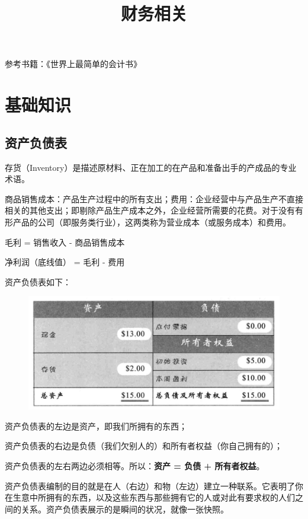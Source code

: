 \documentclass[12pt]{article}
\title{财务相关}
\begin{document}
\maketitle
\tableofcontents

参考书籍：《世界上最简单的会计书》

\section{基础知识}
\subsection{资产负债表}
存货（Inventory）是描述原材料、正在加工的在产品和准备出手的产成品的专业术语。

商品销售成本：产品生产过程中的所有支出；费用：企业经营中与产品生产不直接相关的其他支出；即剔除产品生产成本之外，企业经营所需要的花费。对于没有有形产品的公司（即服务类行业），这两类称为营业成本（或服务成本）和费用。

毛利 = 销售收入 - 商品销售成本

净利润（底线值） = 毛利 - 费用

资产负债表如下：
\begin{figure}[H]
    \centering
    \includegraphics[width=1\textwidth]{fig/accounting_1.png}
\end{figure}

资产负债表的左边是资产，即我们所拥有的东西；

资产负债表的右边是负债（我们欠别人的）和所有者权益（你自己拥有的）；

资产负债表的左右两边必须相等。所以：\textbf{资产 = 负债 + 所有者权益}。

资产负债表编制的目的就是在人（右边）和物（左边）建立一种联系。它表明了你在生意中所拥有的东西，以及这些东西与那些拥有它的人或对此有要求权的人们之间的关系。资产负债表展示的是瞬间的状况，就像一张快照。
\end{document}
